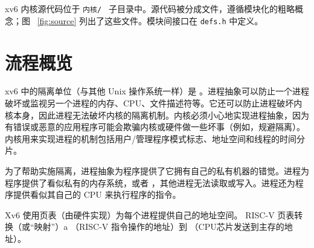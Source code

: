 \documentclass[UTF8]{article}
\begin{document}
xv6 内核源代码位于  {    \tt   内核/   }  子目录中。源代码被分成文件，遵循模块化的粗略概念；图~    \ref{fig:source}    列出了这些文件。模块间接口在    \lstinline{defs.h}           中定义。
    \section{流程概览  }     

xv6 中的隔离单位（与其他 Unix 操作系统一样）是
        。进程抽象可以防止一个进程破坏或监视另一个进程的内存、CPU、文件描述符等。它还可以防止进程破坏内核本身，因此进程无法破坏内核的隔离机制。内核必须小心地实现进程抽象，因为有错误或恶意的应用程序可能会欺骗内核或硬件做一些坏事（例如，规避隔离）。内核用来实现进程的机制包括用户/管理程序模式标志、地址空间和线程的时间分片。  

为了帮助实施隔离，进程抽象为程序提供了它拥有自己的私有机器的错觉。进程为程序提供了看似私有的内存系统，或者
        ，其他进程无法读取或写入。进程还为程序提供看似其自己的 CPU 来执行程序的指令。  

Xv6 使用页表（由硬件实现）为每个进程提供自己的地址空间。 RISC-V 页表转换（或“映射”）a
       （RISC-V 指令操作的地址）到
       （CPU芯片发送到主存的地址）。  
\end{document}
